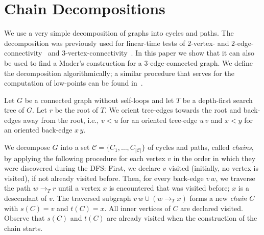 \documentclass[paper=a4]{scrartcl}
\newcommand{\C}{\ensuremath{\mathcal{C}}}
\newcommand{\edge}[2]{\ensuremath{#1\,#2}}
\begin{document}
\section{Chain Decompositions}\label{sec:chain decomposition}

We use a very simple decomposition of graphs into cycles and paths. The decomposition was previously used for linear-time tests of $2$-vertex- and $2$-edge-connectivity~\cite{Schmidt2013a} and $3$-vertex-connectivity~\cite{Schmidt2013}. In this paper we show that it can also be used to find a Mader's construction for a $3$-edge-connected graph. We define the decomposition algorithmically; a similar procedure that serves for the computation of low-points can be found in~\cite{Ramachandran1993}.

Let $G$ be a connected graph without self-loops and let $T$ be a depth-first search tree of $G$. Let $r$ be the root of $T$. We orient tree-edges towards the root and back-edges away from the root, i.e., $v < u$ for an oriented tree-edge $\edge uv$ and $x < y$ for an oriented back-edge $\edge xy$. 


We decompose $G$ into a set $\C = \{C_1,\ldots,C_{|\C|}\}$ of cycles and paths, called \emph{chains}, by applying the following procedure for each vertex $v$ in the order in which they were discovered during the DFS:
First, we declare $v$ visited (initially, no vertex is visited), if not already visited before. Then, for every back-edge $\edge{v}{w}$, we traverse the path $w \rightarrow_{T} r$ until a vertex $x$ is encountered that was visited before; $x$ is a descendant of $v$. The traversed subgraph $\edge{v}{w} \cup (w \rightarrow_{T} x)$ forms a new \emph{chain} $C$ with $s(C)=v$ and $t(C)=x$. All inner vertices of $C$ are declared visited. Observe that $s(C)$ and $t(C)$ are already visited when the construction of the chain starts.
\end{document}
